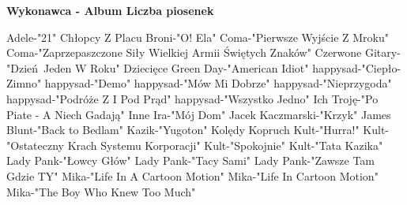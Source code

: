 \documentclass{article}
\begin{document}
{\footnotesize
\textbf{Wykonawca - Album  \tab Liczba piosenek} 


 Adele-"21"   \newline
 Chłopcy Z Placu Broni-"O! Ela"   \newline
 Coma-"Pierwsze Wyjście Z Mroku"   \newline
 Coma-"Zaprzepaszczone Siły Wielkiej Armii Świętych Znaków"   \newline
 Czerwone Gitary-"Dzień Jeden W Roku"   \newline
 Dziecięce   \newline
 Green Day-"American Idiot"   \newline
 happysad-"Ciepło-Zimno"   \newline
 happysad-"Demo"   \newline
 happysad-"Mów Mi Dobrze"   \newline
 happysad-"Nieprzygoda"   \newline
 happysad-"Podróże Z I Pod Prąd"   \newline
 happysad-"Wszystko Jedno"   \newline
 Ich Troję-"Po Piate - A Niech Gadają"   \newline
 Inne   \newline
 Ira-"Mój Dom"   \newline
 Jacek Kaczmarski-"Krzyk"   \newline
 James Blunt-"Back to Bedlam"   \newline
 Kazik-"Yugoton"   \newline
 Kolędy   \newline
 Kopruch   \newline
 Kult-"Hurra!"   \newline
 Kult-"Ostateczny Krach Systemu Korporacji"   \newline
 Kult-"Spokojnie"   \newline
 Kult-"Tata Kazika"   \newline
 Lady Pank-"Łowcy Głów"   \newline
 Lady Pank-"Tacy Sami"   \newline
 Lady Pank-"Zawsze Tam Gdzie TY"   \newline
 Mika-"Life In A Cartoon Motion"   \newline
 Mika-"Life In Cartoon Motion"   \newline
 Mika-"The Boy Who Knew Too Much"   \newline
}
\end{document}
